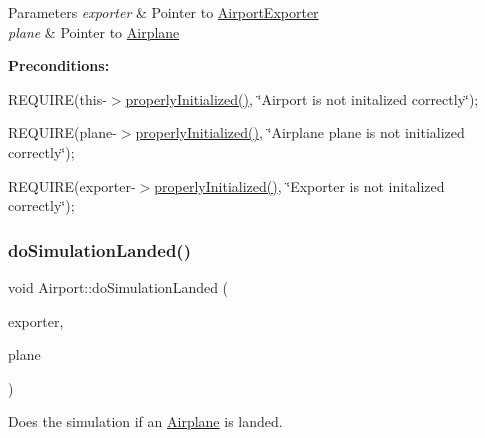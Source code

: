 \begin{DoxyParams}{Parameters}
{\em exporter} & Pointer to \mbox{\hyperlink{class_airport_exporter}{Airport\+Exporter}} \\
\hline
{\em plane} & Pointer to \mbox{\hyperlink{class_airplane}{Airplane}}\\
\hline
\end{DoxyParams}
{\bfseries Preconditions\+:}
\begin{DoxyItemize}
\item R\+E\+Q\+U\+I\+RE(this-\/$>$\mbox{\hyperlink{class_airport_aa13e68ac58e8875837fbe888325cfff6}{properly\+Initialized()}}, \char`\"{}\+Airport is not initalized correctly\char`\"{});
\item R\+E\+Q\+U\+I\+RE(plane-\/$>$\mbox{\hyperlink{class_airport_aa13e68ac58e8875837fbe888325cfff6}{properly\+Initialized()}}, \char`\"{}\+Airplane \textquotesingle{}plane\textquotesingle{} is not initialized correctly\char`\"{});
\item R\+E\+Q\+U\+I\+RE(exporter-\/$>$\mbox{\hyperlink{class_airport_aa13e68ac58e8875837fbe888325cfff6}{properly\+Initialized()}}, \char`\"{}\+Exporter is not initalized correctly\char`\"{}); 
\end{DoxyItemize}\mbox{\label{class_airport_aaecef9cb812cbd5fb6aa64ee357190c9}} 
\subsubsection{\texorpdfstring{do\+Simulation\+Landed()}{doSimulationLanded()}}
{\footnotesize\ttfamily void Airport\+::do\+Simulation\+Landed (\begin{DoxyParamCaption}\item[{\mbox{\hyperlink{class_airport_exporter}{Airport\+Exporter}} $\ast$}]{exporter,  }\item[{\mbox{\hyperlink{class_airplane}{Airplane}} $\ast$}]{plane }\end{DoxyParamCaption})}



Does the simulation if an \mbox{\hyperlink{class_airplane}{Airplane}} is landed. 


